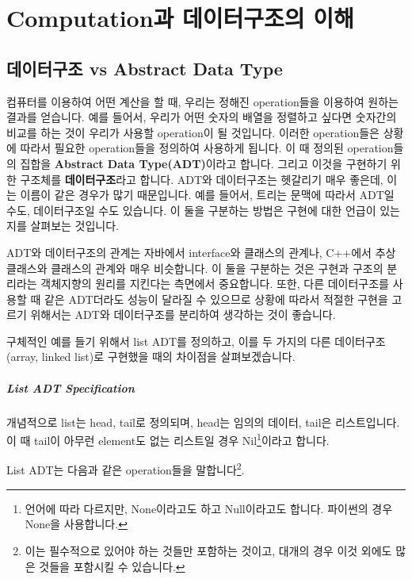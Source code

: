 \documentclass[titlepage]{report}
\begin{document}
\chapter{Computation과 데이터구조의 이해}
 

\section{데이터구조 vs Abstract Data Type} 

컴퓨터를 이용하여 어떤 계산을 할 때, 우리는 정해진 operation들을 이용하여 원하는 결과를 얻습니다. 예를 들어서, 우리가 어떤 숫자의 배열을 정렬하고 싶다면 숫자간의 비교를 하는 것이 우리가 사용할 operation이 될 것입니다. 이러한 operation들은 상황에 따라서 필요한 operation들을 정의하여 사용하게 됩니다. 이 때 정의된 operation들의 집합을 \textbf{Abstract Data Type(ADT)}이라고 합니다. 그리고 이것을 구현하기 위한 구조체를 \textbf{데이터구조}라고 합니다. ADT와 데이터구조는 헷갈리기 매우 좋은데, 이는 이름이 같은 경우가 많기 때문입니다. 예를 들어서, 트리는 문맥에 따라서 ADT일 수도, 데이터구조일 수도 있습니다. 이 둘을 구분하는 방법은 구현에 대한 언급이 있는지를 살펴보는 것입니다. 

ADT와 데이터구조의 관계는 자바에서 interface와 클래스의 관계나, C++에서 추상 클래스와 클래스의 관계와 매우 비슷합니다. 이 둘을 구분하는 것은 구현과 구조의 분리라는 객체지향의 원리를 지킨다는 측면에서 중요합니다. 또한, 다른 데이터구조를 사용할 때 같은 ADT더라도 성능이 달라질 수 있으므로 상황에 따라서 적절한 구현을 고르기 위해서는 ADT와 데이터구조를 분리하여 생각하는 것이 좋습니다. 

구체적인 예를 들기 위해서 list ADT를 정의하고, 이를 두 가지의 다른 데이터구조(array, linked list)로 구현했을 때의 차이점을 살펴보겠습니다. 

\paragraph{List ADT Specification} 

개념적으로 list는 head, tail로 정의되며, head는 임의의 데이터, tail은 리스트입니다. 이 때 tail이 아무런 element도 없는 리스트일 경우 Nil\footnote{언어에 따라 다르지만, None이라고도 하고 Null이라고도 합니다. 파이썬의 경우 None을 사용합니다.}이라고 합니다. 

List ADT는 다음과 같은 operation들을 말합니다\footnote{이는 필수적으로 있어야 하는 것들만 포함하는 것이고, 대개의 경우 이것 외에도 많은 것들을 포함시킬 수 있습니다.}. 
\end{document}
